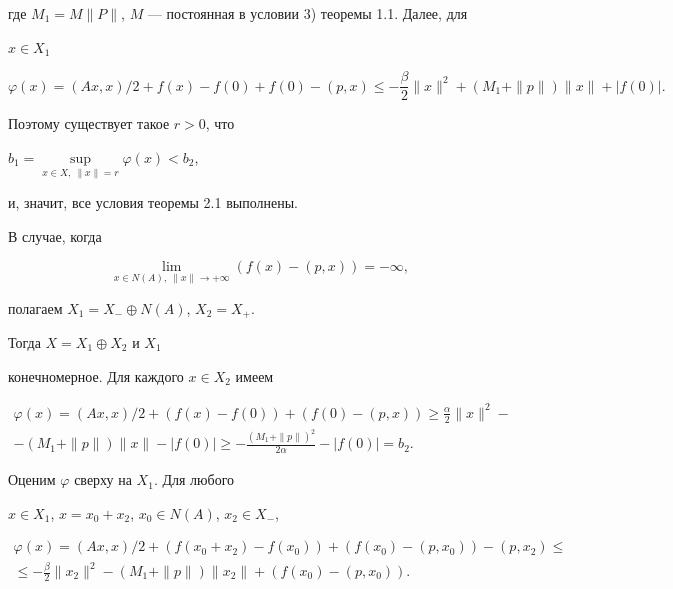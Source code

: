 где $M_1=M\|P\|$, $M$ --- постоянная в условии 3) теоремы 1.1. Далее, для


$x\in X_1$


$$


\varphi (x)=(Ax,x)/2+f(x)-f(0)+f(0)-(p,x)\le -\frac{\beta}{2}\| x\| ^2+(M_1+


\| p\|)\| x\| +| f(0)|.


$$


Поэтому существует такое $r>0$, что


$b_1=\sup\limits_{x\in X,\ \| x\| =r}\varphi (x)<b_2$,


и, значит, все условия теоремы 2.1 выполнены.


В случае, когда


\begin{equation}


\lim\limits_{x\in N(A),\ \| x\|\to +\infty} (f(x)-(p,x))= -\infty,


\label{eq2.3}


\end{equation}


полагаем $X_1=X_-\oplus N(A)$, $X_2=X_+$.


Тогда $ X=X_1\oplus X_2$ и $X_1$


конечномерное. Для каждого $x\in X_2$ имеем


\begin{multline*}


\varphi(x)=(Ax,x)/2+(f(x)-f(0))+(f(0)-(p,x))\ge\frac{\alpha}{2}\| x\| ^2- \\


-(M_1+\| p\|)\|x\|-| f(0)|\ge-\frac{(M_1+\| p\|)^2}{2\alpha} -| f(0)| =b_2.


\end{multline*}





Оценим $\varphi$ сверху на $X_1$. Для любого


$x\in X_1$, $x=x_0+x_2$, $x_0\in N(A)$, $x_2\in X_-$,


\begin{multline*}


\varphi (x)=(Ax,x)/2+(f(x_0+x_2)-f(x_0))+(f(x_0)-(p,x_0))-(p,x_2)\le \\


\le -\frac{\beta}{2}\| x_2\| ^2-(M_1+\| p\|)\| x_2\| +(f(x_0)-(p,x_0)).


\end{multline*}





